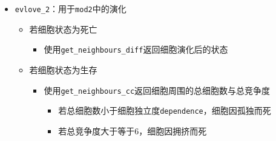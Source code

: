 \documentclass[11pt]{article}
\providecommand{\tightlist}{%
      \setlength{\itemsep}{0pt}\setlength{\parskip}{0pt}}
\begin{document}
\begin{itemize}
\tightlist
\item
  \texttt{evlove\_2}：用于\texttt{mod2}中的演化

  \begin{itemize}
  \tightlist
  \item
    若细胞状态为死亡

    \begin{itemize}
    \tightlist
    \item
      使用\texttt{get\_neighbours\_diff}返回细胞演化后的状态
    \end{itemize}
  \item
    若细胞状态为生存

    \begin{itemize}
    \tightlist
    \item
      使用\texttt{get\_neighbours\_cc}返回细胞周围的总细胞数与总竞争度

      \begin{itemize}
      \tightlist
      \item
        若总细胞数小于细胞独立度\texttt{dependence}，细胞因孤独而死
      \item
        若总竞争度大于等于6，细胞因拥挤而死
      \end{itemize}
    \end{itemize}
  \end{itemize}
\end{itemize}
\end{document}
